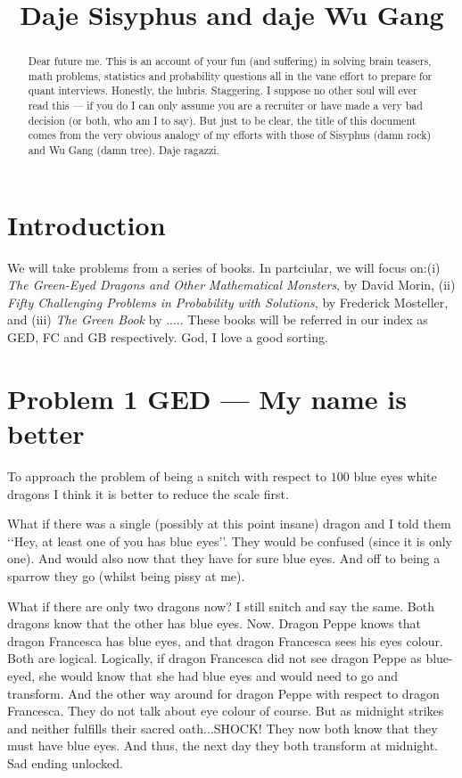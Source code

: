 \documentclass{article}
\title{Daje Sisyphus and daje Wu Gang}
\date{}
\begin{document}
\maketitle


\begin{abstract}
    Dear future me. This is an account of your fun (and suffering) in solving brain teasers, math problems, statistics and probability questions all in the vane effort to prepare for quant interviews. Honestly, the hubris. Staggering. I suppose no other soul will ever read this --- if you do I can only assume you are a recruiter or have made a very bad decision (or both, who am I to say). But just to be clear, the title of this document comes from the very obvious analogy of my efforts with those of Sisyphus (damn rock) and Wu Gang (damn tree). Daje ragazzi.
\end{abstract}

\newpage
\tableofcontents
\newpage

\section{Introduction}

We will take problems from a series of books. In partciular, we will focus on:(i) \textit{The Green-Eyed Dragons and Other Mathematical Monsters}, by David Morin, (ii) \textit{Fifty Challenging Problems in Probability with Solutions}, by Frederick Mosteller, and (iii) \textit{The Green Book} by ..... These books will be referred in our index as GED, FC and GB respectively. God, I love a good sorting.

\section{Problem 1 GED --- My name is better }

To approach the problem of being a snitch with respect to $100$ blue eyes white dragons I think it is better to reduce the scale first. 

What if there was a single (possibly at this point insane) dragon and I told them \lq\lq Hey, at least one of you has blue eyes\rq\rq. They would be confused (since it is only one). And would also now that they have for sure blue eyes. And off to being a sparrow they go (whilst being pissy at me). 

What if there are only two dragons now? I still snitch and say the same. Both dragons know that the other has blue eyes. Now. Dragon Peppe knows that dragon Francesca has blue eyes, and that dragon Francesca sees his eyes colour. Both are logical. Logically, if dragon Francesca did not see dragon Peppe as blue-eyed, she would know that she had blue eyes and would need to go and transform. And the other way around for dragon Peppe with respect to dragon Francesca. They do not talk about eye colour of course. But as midnight strikes and neither fulfills their sacred oath...SHOCK! They now both know that they must have blue eyes. And thus, the next day they both transform at midnight. Sad ending unlocked. 
\end{document}
